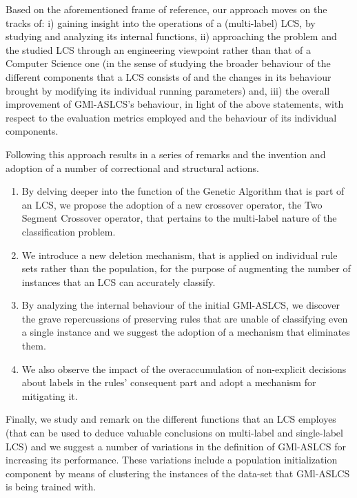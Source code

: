 {Based on the aforementioned frame of reference, our approach moves on the tracks of: i) gaining insight into the operations of a (multi-label) LCS, by studying and analyzing its internal functions, ii) approaching the problem and the studied LCS through an engineering viewpoint rather than that of a Computer Science one (in the sense of studying the broader behaviour of the different components that a LCS consists of and the changes in its behaviour brought by modifying its individual running parameters) and, iii) the overall improvement of GMl-ASLCS's behaviour, in light of the above statements, with respect to the evaluation metrics employed and the behaviour of its individual components.

Following this approach results in a series of remarks and the invention and adoption of a number of correctional and structural actions. 
\begin{enumerate}
\item By delving deeper into the function of the Genetic Algorithm that is part of an LCS, we propose the adoption of a new crossover operator, the Two Segment Crossover operator, that pertains to the multi-label nature of the classification problem.
\item We introduce a new deletion mechanism, that is applied on individual rule sets rather than the population, for the purpose of augmenting the number of instances that an LCS can accurately classify.
\item By analyzing the internal behaviour of the initial GMl-ASLCS, we discover the grave repercussions of preserving rules that are unable of classifying even a single instance and we suggest the adoption of a mechanism that eliminates them.
\item We also observe the impact of the overaccumulation of non-explicit decisions about labels in the rules' consequent part and adopt a mechanism for mitigating it.
\end{enumerate}

Finally, we study and remark on the different functions that an LCS employes (that can be used to deduce valuable conclusions on multi-label and single-label LCS) and we suggest a number of variations in the definition of GMl-ASLCS for increasing its performance. These variations include a population initialization component by means of clustering the instances of the data-set that GMl-ASLCS is being trained with.

}
